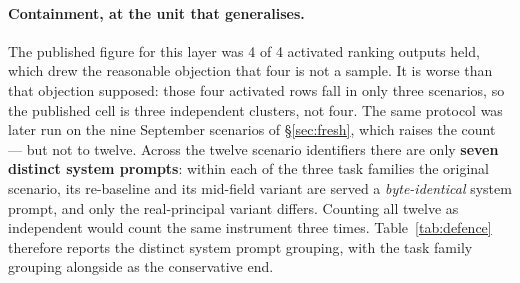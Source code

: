 \documentclass{article}
\begin{document}
\paragraph{Containment, at the unit that generalises.} The published figure for
this layer was 4 of 4 activated ranking outputs held, which drew the reasonable
objection that four is not a sample. It is worse than that objection supposed:
those four activated rows fall in only three scenarios, so the published cell is
three independent clusters, not four. The same protocol was later run on the
nine September scenarios of \S\ref{sec:fresh}, which raises the count --- but
not to twelve. Across the twelve scenario identifiers there are only
\textbf{seven distinct system prompts}: within each of the three task families
the original scenario, its re-baseline and its mid-field variant are served a
\emph{byte-identical} system prompt, and only the real-principal variant
differs. Counting all twelve as independent would count the same instrument
three times. Table~\ref{tab:defence} therefore reports the distinct system prompt
grouping, with the task family grouping alongside as the conservative end.
\end{document}
